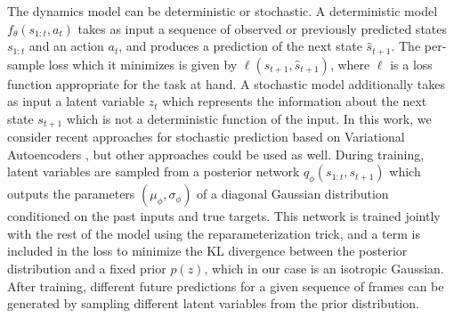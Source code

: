 \documentclass{article} %
\begin{document}
The dynamics model can be deterministic or stochastic.
A deterministic model $f_\theta(s_{1:t}, a_t)$ takes as input a sequence of observed or previously predicted states $s_{1:t}$ and an action $a_t$, and produces a prediction of the next state $\hat{s}_{t+1}$. The per-sample loss which it minimizes is given by $\ell(s_{t+1}, \hat{s}_{t+1})$, where $\ell$ is a loss function appropriate for the task at hand.
A stochastic model additionally takes as input a latent variable $z_t$ which represents the information about the next state $s_{t+1}$ which is not a deterministic function of the input.
In this work, we consider recent approaches for stochastic prediction based on Variational Autoencoders \citep{VAE, Babaeizadeh2018, Denton2018}, but other approaches could be used as well.
During training, latent variables are sampled from a posterior network $q_\phi(s_{1:t}, s_{t+1})$ which outputs the parameters $(\mu_\phi, \sigma_\phi)$ of a diagonal Gaussian distribution conditioned on the past inputs and true targets. This network is trained jointly with the rest of the model using the reparameterization trick, and a term is included in the loss to minimize the KL divergence between the posterior distribution and a fixed prior $p(z)$, which in our case is an isotropic Gaussian.
After training, different future predictions for a given sequence of frames can be generated by sampling different latent variables from the prior distribution.







\end{document}
